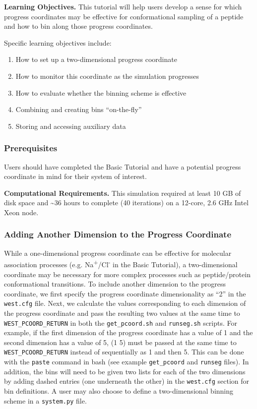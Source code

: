 \documentclass[9pt,tutorial]{livecoms}
\begin{document}
\textbf{Learning Objectives.} This tutorial will help users develop a sense for which progress coordinates may be effective for conformational sampling of a peptide and how to bin along those progress coordinates.  

Specific learning objectives include:
\begin{enumerate}
\item How to set up a two-dimensional progress coordinate
\item How to monitor this coordinate as the simulation progresses
\item How to evaluate whether the binning scheme is effective
\item Combining and creating bins “on-the-fly”
\item Storing and accessing auxiliary data
\end{enumerate}

\subsubsection{Prerequisites}

Users should have completed the Basic Tutorial and have a potential progress coordinate in mind for their system of interest. 

\textbf{Computational Requirements.} This simulation required at least 10 GB of disk space and \textasciitilde 36 hours to complete (40 iterations) on a 12-core, 2.6 GHz Intel Xeon node.

\subsubsection{Adding Another Dimension to the Progress Coordinate}

While a one-dimensional progress coordinate can be effective for molecular association processes (e.g. Na\textsuperscript{+}/Cl\textsuperscript{-} in the Basic Tutorial), a two-dimensional coordinate may be necessary for more complex processes such as peptide/protein conformational transitions. 
To include another dimension to the progress coordinate, we first specify the progress coordinate dimensionality as “2” in the \verb|west.cfg| file. 
Next, we calculate the values corresponding to each dimension of the progress coordinate and pass the resulting two values at the same time to \verb|WEST_PCOORD_RETURN| in both the \verb|get_pcoord.sh| and \verb|runseg.sh| scripts. 
For example, if the first dimension of the progress coordinate has a value of 1 and the second dimension has a value of 5, (1 5) must be passed at the same time to \verb|WEST_PCOORD_RETURN| instead of sequentially as 1 and then 5. 
This can be done with the \verb|paste| command in bash (see example \verb|get_pcoord| and \verb|runseg| files). 
In addition, the bins will need to be given two lists for each of the two dimensions by adding dashed entries (one underneath the other) in the \verb|west.cfg| section for bin definitions. 
A user may also choose to define a two-dimensional binning scheme in a \verb|system.py| file.
\end{document}

